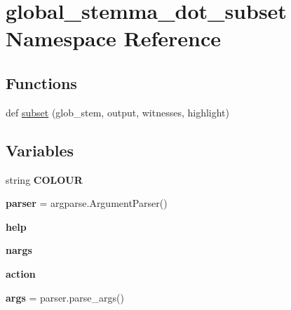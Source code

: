 \hypertarget{namespaceglobal__stemma__dot__subset}{}\section{global\+\_\+stemma\+\_\+dot\+\_\+subset Namespace Reference}
\label{namespaceglobal__stemma__dot__subset}
\subsection*{Functions}
\begin{DoxyCompactItemize}
\item 
def \hyperlink{namespaceglobal__stemma__dot__subset_aed22752c43fa819ba5d14b55ffe8c3ed}{subset} (glob\+\_\+stem, output, witnesses, highlight)
\end{DoxyCompactItemize}
\subsection*{Variables}
\begin{DoxyCompactItemize}
\item 
string {\bfseries C\+O\+L\+O\+UR}
\item 
\mbox{\label{namespaceglobal__stemma__dot__subset_a6ff131314e2c2fb374e0603818bc431b}} 
{\bfseries parser} = argparse.\+Argument\+Parser()
\item 
\mbox{\label{namespaceglobal__stemma__dot__subset_ab7cf88f76c42a54fef8db159dbfcd8eb}} 
{\bfseries help}
\item 
\mbox{\label{namespaceglobal__stemma__dot__subset_a98e3f3eb81359cfbf3322a14551b4c17}} 
{\bfseries nargs}
\item 
\mbox{\label{namespaceglobal__stemma__dot__subset_a757c1f40e97614c4857bcc40255e0691}} 
{\bfseries action}
\item 
\mbox{\label{namespaceglobal__stemma__dot__subset_ae0b906928462abf106e77b693c20c06c}} 
{\bfseries args} = parser.\+parse\+\_\+args()
\end{DoxyCompactItemize}


